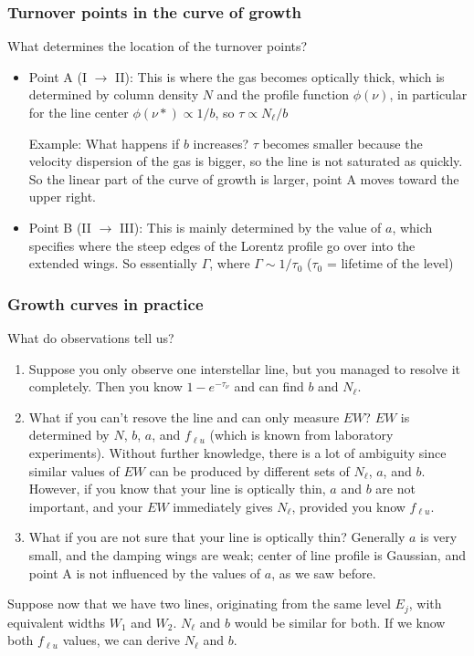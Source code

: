 \documentclass[11pt]{article}
\newcommand{\mar}[1]{\hspace{0pt}\marginpar{-\textcolor{black}{#1}-}}
\begin{document}
\subsubsection{Turnover points in the curve of growth}
\mar{94}What determines the location of the turnover points?
\begin{itemize}
    \item Point A (I $\rightarrow$ II): This is where the gas becomes
        optically thick, which is determined by column density $N$ and
        the profile function $\phi(\nu)$, in particular for the line
        center $\phi(\nu*) \propto 1/b$, so $\tau \propto N_{\ell}/b$

        Example: What happens if $b$ increases? $\tau$ becomes smaller
        because the velocity dispersion of the gas is bigger, so the
        line is not saturated as quickly. So the linear part of the
        curve of growth is larger, point A moves toward the upper right.
    \item Point B (II $\rightarrow$ III): This is mainly determined by
        the value of $a$, which specifies where the steep edges of the
        Lorentz profile go over into the extended wings. So essentially
        $\Gamma$, where $\Gamma \sim 1/\tau_{0}$ ($\tau_{0}$ = lifetime
        of the level)
\end{itemize}
\subsubsection{Growth curves in practice}
What do observations tell us?
\begin{enumerate}[itemsep=1ex, label={\Roman*}.]
    \item Suppose you only observe one interstellar line, but you managed
        to resolve it completely. Then you know $ 1 - e^{-\tau_{\nu}} $
        and can find $b$ and $N_{\ell}$.
    \item What if you can't resove the line and can only measure $EW$?
        $EW$ is determined by $N$, $b$, $a$, and $f_{{\ell}u}$ (which is known
        from laboratory experiments).
        \mar{95}Without further knowledge, there is a lot of ambiguity
        since similar values of $EW$ can be produced by different sets of
        $N_{\ell}$, $a$, and $b$. However, if you know that your line is
        optically thin, $a$ and $b$ are not important, and your $EW$
        immediately gives $N_{\ell}$, provided you know $f_{{\ell}u}$.
    \item What if you are not sure that your line is optically thin?
        Generally $a$ is very small, and the damping wings are weak;
        center of line profile is Gaussian, and point A is not influenced
        by the values of $a$, as we saw before.
\end{enumerate}
Suppose now that we have two lines, originating from the same level $E_{j}$,
with equivalent widths $W_{1}$ and $W_{2}$. $N_{\ell}$ and $b$ would be
similar for both. If we know both $f_{{\ell}u}$ values, we can derive
$N_{\ell}$ and $b$.
\end{document}
